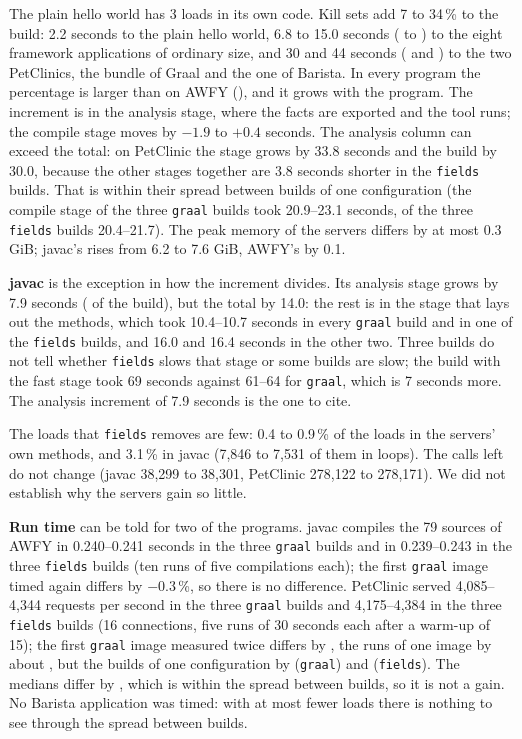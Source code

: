 The plain hello world has 3 loads in its own code. Kill sets add 7 to 34\,\% to the build: 2.2 seconds to the plain hello world, 6.8 to 15.0 seconds ( to ) to
the eight framework applications of ordinary size, and 30 and 44 seconds ( and ) to the two PetClinics, the
bundle of Graal and the one of Barista. In every program the percentage is larger than on AWFY (), and it grows with the
program. The increment
is in the analysis stage, where the facts are exported and the tool runs; the compile stage moves by \mbox{$-1.9$} to
$+0.4$ seconds. The analysis column can exceed the total: on PetClinic the stage grows by 33.8 seconds and the build by 30.0,
because the other stages together are 3.8 seconds shorter in the \texttt{fields} builds. That is within their spread between
builds of one configuration (the compile stage of the three \texttt{graal} builds took 20.9--23.1 seconds, of the three
\texttt{fields} builds 20.4--21.7). The peak memory of the servers differs by at most 0.3 GiB; javac's rises from 6.2 to 7.6
GiB, AWFY's by 0.1.

\textbf{javac} is the exception in how the increment divides. Its analysis stage grows by 7.9 seconds ( of the
build), but the total by 14.0: the rest is in the stage that lays out the methods, which took 10.4--10.7 seconds in every
\texttt{graal} build and in one of the \texttt{fields} builds, and 16.0 and 16.4 seconds in the other two. Three builds do not
tell whether \texttt{fields} slows that stage or some builds are slow; the build with the fast stage took 69 seconds against
61--64 for \texttt{graal}, which is 7 seconds more. The analysis increment of 7.9 seconds is the one to cite.

The loads that \texttt{fields} removes are few: 0.4 to 0.9\,\% of the loads in the servers' own methods, and 3.1\,\% in javac
(7,846 to 7,531 of them in loops). The calls left do not change (javac 38,299 to 38,301, PetClinic 278,122 to 278,171). We did
not establish why the servers gain so little.

\textbf{Run time} can be told for two of the programs. javac compiles the 79 sources of AWFY in 0.240--0.241 seconds in the
three \texttt{graal} builds and in 0.239--0.243 in the three \texttt{fields} builds (ten runs of five compilations each); the
first \texttt{graal} image timed again differs by $-0.3$\,\%, so there is no difference. PetClinic served 4,085--4,344 requests
per second in the three \texttt{graal} builds and 4,175--4,384 in the three \texttt{fields} builds (16 connections, five runs
of 30 seconds each after a warm-up of 15); the first \texttt{graal} image measured twice differs by , the runs of one
image by about , but the builds of one configuration by  (\texttt{graal}) and  (\texttt{fields}). The
medians differ by , which is within the spread between builds, so it is not a gain. No Barista application was timed:
with at most  fewer loads there is nothing to see through the spread between builds.

